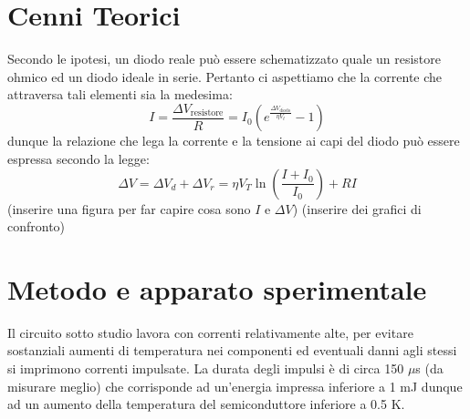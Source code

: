 \documentclass{article}[a4paper, oneside, 11pt]
\begin{document}
\section{Cenni Teorici}
Secondo le ipotesi, un diodo reale può essere schematizzato quale un resistore 
ohmico ed un diodo ideale in serie. Pertanto ci aspettiamo che la corrente che 
attraversa tali elementi sia la medesima:
\begin{equation}
	I = \frac{\Delta V_{\text{resistore}}}{R} =
	I_0 \left( e^{\frac{\Delta V_{\text{diodo}}}{\eta V_t}} - 1\right)
\end{equation}
dunque la relazione che lega la corrente e la tensione ai capi del diodo può 
essere espressa secondo la legge:
\begin{equation}\label{eq: model}
	\Delta V = \Delta V_d + \Delta V_r = \eta V_T \ln{\left(\frac{
	I+I_0}{I_0}\right)} + RI
\end{equation}
(inserire una figura per far capire cosa sono $I$ e $\Delta V$)\newline
(inserire dei grafici di confronto)


\section{Metodo e apparato sperimentale}
Il circuito sotto studio lavora con correnti relativamente alte, per evitare 
sostanziali aumenti di temperatura nei componenti ed eventuali danni agli 
stessi si imprimono correnti impulsate.
La durata degli impulsi è di circa 150 $\mu$s (da misurare meglio) che 
corrisponde ad un'energia impressa inferiore a 1 mJ dunque ad un aumento della 
temperatura del semiconduttore inferiore a 0.5 K.

\end{document}
